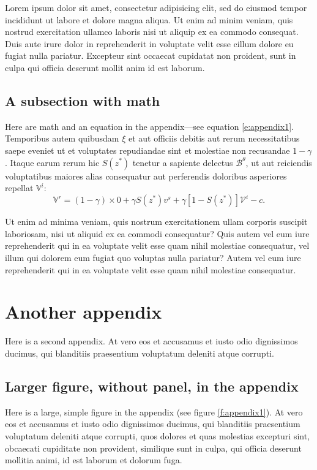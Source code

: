 \documentclass[letterpaper,12pt,leqno]{article}
\begin{document}
Lorem ipsum dolor sit amet, consectetur adipisicing elit, sed do eiusmod
tempor incididunt ut labore et dolore magna aliqua. Ut enim ad minim veniam,
quis nostrud exercitation ullamco laboris nisi ut aliquip ex ea commodo
consequat. Duis aute irure dolor in reprehenderit in voluptate velit esse
cillum dolore eu fugiat nulla pariatur. Excepteur sint occaecat cupidatat non
proident, sunt in culpa qui officia deserunt mollit anim id est laborum.

\subsection{A subsection with math}

Here are math and an equation in the appendix---see equation \eqref{e:appendix1}. Temporibus autem quibusdam $\xi$ et aut officiis debitis aut rerum necessitatibus saepe eveniet ut et voluptates repudiandae sint et molestiae non recusandae $1-\gamma$. Itaque earum rerum hic $S(z^*)$ tenetur a sapiente delectus $\mathcal{B}^\theta$, ut aut reiciendis voluptatibus maiores alias consequatur aut perferendis doloribus asperiores repellat $\mathbb{V}^i$:
\begin{equation}
\mathbb{V}^r = (1-\gamma) \times 0 +\gamma S(z^*) v^s+\gamma [1-S(z^*)] \mathcal{V}^i-c.
\label{e:appendix1}\end{equation}

Ut enim ad minima veniam, quis nostrum exercitationem ullam corporis suscipit laboriosam, nisi ut aliquid ex ea commodi consequatur? Quis autem vel eum iure reprehenderit qui in ea voluptate velit esse quam nihil molestiae consequatur, vel illum qui dolorem eum fugiat quo voluptas nulla pariatur? Autem vel eum iure reprehenderit qui in ea voluptate velit esse quam nihil molestiae consequatur.

\section{Another appendix}\label{a:appendix2}

Here is a second appendix. At vero eos et accusamus et iusto odio dignissimos ducimus, qui blanditiis praesentium voluptatum deleniti atque corrupti.

\subsection{Larger figure, without panel, in the appendix} 

Here is a large, simple figure in the appendix (see figure \ref{f:appendix1}). At vero eos et accusamus et iusto odio dignissimos ducimus, qui blanditiis praesentium voluptatum deleniti atque corrupti, quos dolores et quas molestias excepturi sint, obcaecati cupiditate non provident, similique sunt in culpa, qui officia deserunt mollitia animi, id est laborum et dolorum fuga.
\end{document}
